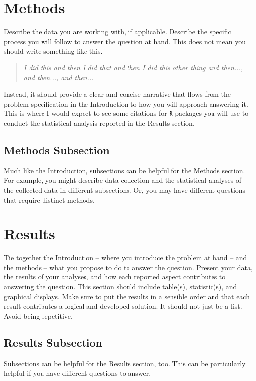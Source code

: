 \documentclass{article}\usepackage[]{graphicx}\usepackage[]{xcolor}
\newenvironment{Figure}
  {\par\medskip\noindent\minipage{\linewidth}}
  {\endminipage\par\medskip}
\begin{document}
\begin{multicols}{2}

\section{Methods}
Describe the data you are working with, if applicable. Describe the specific process you will follow to answer the question at hand. This does not mean you should write something like this.
\begin{quote}
\textit{I did this and then I did that and then I did this other thing and then..., and then..., and then...}
\end{quote}
Instead, it should provide a clear and concise narrative that flows from the problem specification in the Introduction to how you will approach answering it. This is where I would expect to see some citations for \texttt{R} packages you will use to conduct the statistical analysis reported in the Results section.


\subsection{Methods Subsection}
Much like the Introduction, subsections can be helpful for the Methods section. For example, you might describe data collection and the statistical analyses of the collected data in different subsections. Or, you may have different questions that require distinct methods. 

\section{Results}
Tie together the Introduction -- where you introduce the problem at hand -- and the methods --  what you propose to do to answer the question. Present your data, the results of your analyses, and how each reported aspect contributes to answering the question. This section should include table(s), statistic(s), and graphical displays. Make sure to put the results in a sensible order and that each result contributes a logical and developed solution. It should not just be a list. Avoid being repetitive. 

\subsection{Results Subsection}
Subsections can be helpful for the Results section, too. This can be particularly helpful if you have different questions to answer. 



\end{multicols}
\end{document}
